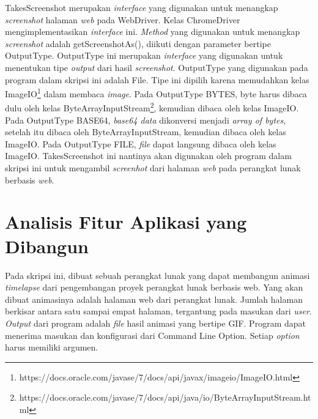 TakesScreenshot merupakan \textit{interface} yang digunakan untuk menangkap \textit{screenshot} halaman \textit{web} pada WebDriver. Kelas ChromeDriver mengimplementasikan \textit{interface} ini. \textit{Method} yang digunakan untuk menangkap \textit{screenshot} adalah getScreenshotAs(), diikuti dengan parameter bertipe OutputType. OutputType ini merupakan \textit{interface} yang digunakan untuk menentukan tipe \textit{output} dari hasil \textit{screenshot}. OutputType yang digunakan pada program dalam skripsi ini adalah File.    
Tipe ini dipilih karena memudahkan kelas ImageIO\footnote{https://docs.oracle.com/javase/7/docs/api/javax/imageio/ImageIO.html} dalam membaca \textit{image}. Pada OutputType BYTES, byte harus dibaca dulu oleh kelas ByteArrayInputStream\footnote{https://docs.oracle.com/javase/7/docs/api/java/io/ByteArrayInputStream.html}, kemudian dibaca oleh kelas ImageIO. Pada OutputType BASE64, \textit{base64 data} dikonversi menjadi \textit{array of bytes}, setelah itu dibaca oleh ByteArrayInputStream, kemudian dibaca oleh kelas ImageIO. Pada OutputType FILE, \textit{file} dapat langsung dibaca oleh kelas ImageIO. TakesScreenshot ini nantinya akan digunakan oleh program dalam skripsi ini untuk mengambil \textit{screenhot} dari halaman \textit{web} pada perangkat lunak berbasis \textit{web}. 



\section{Analisis Fitur Aplikasi yang Dibangun}
\label{sec:analisis_fitur_aplikasi}
Pada skripsi ini, dibuat sebuah perangkat lunak yang dapat membangun animasi \textit{timelapse}
dari pengembangan proyek perangkat lunak berbasis web. Yang akan dibuat animasinya adalah
halaman web dari perangkat lunak. Jumlah halaman berkisar antara satu sampai empat halaman, tergantung pada masukan dari \textit{user}. \textit{Output} dari program adalah \textit{file} hasil animasi yang bertipe GIF. Program dapat menerima masukan dan konfigurasi dari Command Line Option. Setiap \textit{option} harus memiliki argumen. 

